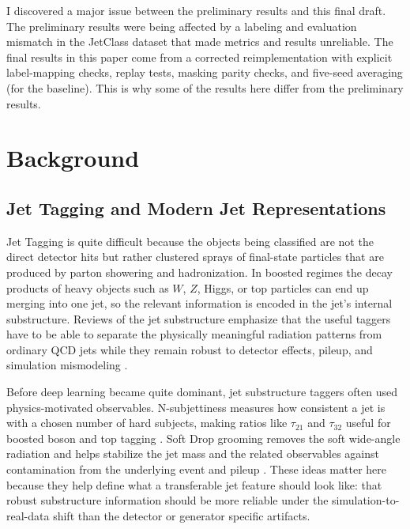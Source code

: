 \documentclass[11pt]{article}
\begin{document}
I discovered a major issue between the preliminary results and this final draft. The preliminary results were being affected by a labeling and evaluation mismatch in the JetClass dataset that made metrics and results unreliable. The final results in this paper come from a corrected reimplementation with explicit label-mapping checks, replay tests, masking parity checks, and five-seed averaging (for the baseline). This is why some of the results here differ from the preliminary results.





\section{Background}

\subsection{Jet Tagging and Modern Jet Representations}

Jet Tagging is quite difficult because the objects being classified are not the direct detector hits but rather clustered sprays of final-state particles that are produced by parton showering and hadronization. In boosted regimes the decay products of heavy objects such as $W$, $Z$, Higgs, or top particles can end up merging into one jet, so the relevant information is encoded in the jet’s internal substructure. Reviews of the jet substructure emphasize that the useful taggers have to be able to separate the physically meaningful radiation patterns from ordinary QCD jets while they remain robust to detector effects, pileup, and simulation mismodeling \cite{larkoski2017jet,kogler2019jet}.

Before deep learning became quite dominant, jet substructure taggers often used physics-motivated observables. N-subjettiness measures how consistent a jet is with a chosen number of hard subjects, making ratios like $\tau_{21}$ and $\tau_{32}$ useful for boosted boson and top tagging \cite{thaler2011nsubjettiness,thaler2012nsubjettiness}. Soft Drop grooming removes the soft wide-angle radiation and helps stabilize the jet mass and the related observables against contamination from the underlying event and pileup  \cite{larkoski2014softdrop}. These ideas matter here because they help define what a transferable jet feature should look like: that robust substructure information should be more reliable under the simulation-to-real-data shift than the detector or generator specific artifacts.
\end{document}
